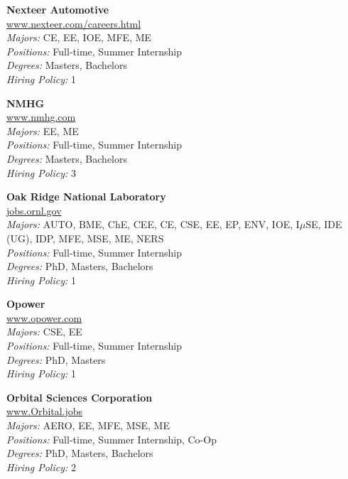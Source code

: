 \documentclass[twoside]{article}
\begin{document}
\begin{center}
\begin{multicols}{3}
\begin{minipage}{.9\columnwidth}{\Large\bf Nexteer Automotive }\\
	\url{www.nexteer.com/careers.html}\\
	\emph{Majors:} CE, EE, IOE, MFE, ME\\
	\emph{Positions:} Full-time, Summer Internship\\
	\emph{Degrees:} Masters, Bachelors\\
	\emph{Hiring Policy:} 1\\
\end{minipage}
 
\begin{minipage}{.9\columnwidth}{\Large\bf NMHG }\\
	\url{www.nmhg.com}\\
	\emph{Majors:} EE, ME\\
	\emph{Positions:} Full-time, Summer Internship\\
	\emph{Degrees:} Masters, Bachelors\\
	\emph{Hiring Policy:} 3\\
\end{minipage}
 
\begin{minipage}{.9\columnwidth}{\Large\bf Oak Ridge National Laboratory }\\
	\url{jobs.ornl.gov}\\
	\emph{Majors:} AUTO, BME, ChE, CEE, CE, CSE, EE, EP, ENV, IOE, I$\mu$SE, IDE (UG), IDP, MFE, MSE, ME, NERS\\
	\emph{Positions:} Full-time, Summer Internship\\
	\emph{Degrees:} PhD, Masters, Bachelors\\
	\emph{Hiring Policy:} 1\\
\end{minipage}
 
\begin{minipage}{.9\columnwidth}{\Large\bf Opower }\\
	\url{www.opower.com}\\
	\emph{Majors:} CSE, EE\\
	\emph{Positions:} Full-time, Summer Internship\\
	\emph{Degrees:} PhD, Masters\\
	\emph{Hiring Policy:} 1\\
\end{minipage}
 
\begin{minipage}{.9\columnwidth}{\Large\bf Orbital Sciences Corporation }\\
	\url{www.Orbital.jobs}\\
	\emph{Majors:} AERO, EE, MFE, MSE, ME\\
	\emph{Positions:} Full-time, Summer Internship, Co-Op\\
	\emph{Degrees:} PhD, Masters, Bachelors\\
	\emph{Hiring Policy:} 2\\
\end{minipage}
 

\end{multicols}
\end{center}
\end{document}
